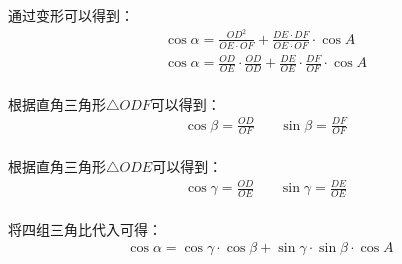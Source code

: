\documentclass[UTF8]{ctexart}
\begin{document}
    通过变形可以得到：
    \begin{align}
        &\cos{\alpha}=\frac{OD^2}{OE\cdot OF}+\frac{DE\cdot DF}{OE\cdot OF}\cdot\cos{A}\\[3mm]
        &\cos{\alpha}=\frac{OD}{OE}\cdot\frac{OD}{OD}+\frac{DE}{OE}\cdot\frac{DF}{OF}\cdot\cos{A}
    \end{align}\\
    根据直角三角形$\triangle ODF$可以得到：
    \begin{align}
        &\cos{\beta}=\frac{OD}{OF}~~~~~~~~\sin{\beta}=\frac{DF}{OF}
    \end{align}\\
    根据直角三角形$\triangle ODE$可以得到：
    \begin{align}
        &\cos{\gamma}=\frac{OD}{OE}~~~~~~~~\sin{\gamma}=\frac{DE}{OE}
    \end{align}\\
    将四组三角比代入可得：
    \begin{align}
        \cos{\alpha}=\cos{\gamma}\cdot\cos{\beta}+\sin{\gamma}\cdot\sin{\beta}\cdot\cos{A}
    \end{align}

\newpage
\end{document}

